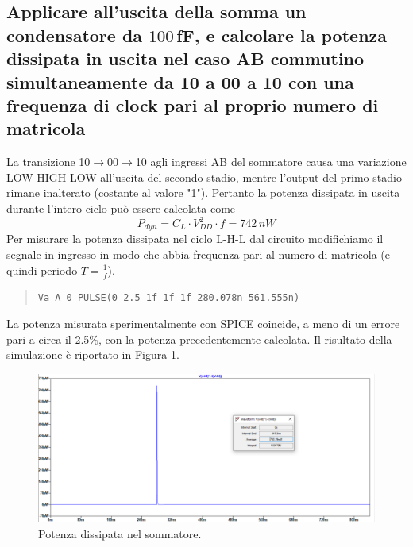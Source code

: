 \documentclass[a4paper,10pt]{article}
\begin{document}
\subsection{Applicare all'uscita della somma un condensatore da $100\,$fF, e calcolare la potenza dissipata in uscita nel caso AB commutino simultaneamente da 10 a 00 a 10 con una frequenza di clock pari al proprio numero di matricola}
La transizione 10$\rightarrow$00$\rightarrow$10 agli ingressi AB del sommatore causa una variazione LOW-HIGH-LOW all'uscita del secondo stadio, mentre l'output del primo stadio rimane inalterato (costante al valore "1"). Pertanto la potenza dissipata in uscita durante l'intero ciclo può essere calcolata come
\begin{equation*}
P_{dyn}=C_L\cdot V_{DD}^2 \cdot f = 742\,nW
\end{equation*}
Per misurare la potenza dissipata nel ciclo L-H-L dal circuito modifichiamo il segnale in ingresso in modo che abbia frequenza pari al numero di matricola (e quindi periodo $T=\frac{1}{f}$).
\begin{quote}
\begin{verbatim}
Va A 0 PULSE(0 2.5 1f 1f 1f 280.078n 561.555n)
\end{verbatim}
\end{quote}
La potenza misurata sperimentalmente con SPICE coincide, a meno di un errore pari a circa il 2.5\%, con la potenza precedentemente calcolata. Il risultato della simulazione è riportato in Figura \ref{fig:powerso}.

\begin{figure}[h!]
  	\centering
 	\includegraphics[width=1\linewidth]{es2-2power.png}
  	\caption{Potenza dissipata nel sommatore.}
  	\label{fig:powerso}
\end{figure}
\newpage
\end{document}

